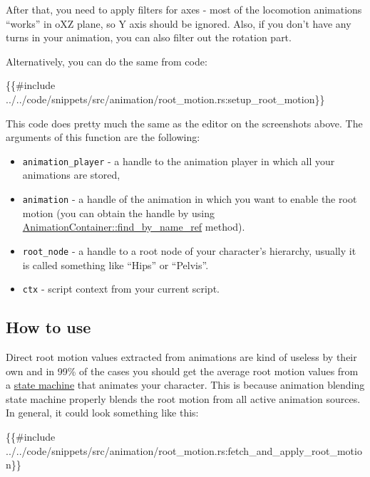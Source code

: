 \documentclass[
]{book}
\newenvironment{Shaded}{\begin{snugshade}}{\end{snugshade}}
\newcommand{\NormalTok}[1]{#1}
\providecommand{\tightlist}{%
  \setlength{\itemsep}{0pt}\setlength{\parskip}{0pt}}
\theoremstyle{definition}
\theoremstyle{definition}
\theoremstyle{definition}
\theoremstyle{definition}
\theoremstyle{remark}
\begin{document}
After that, you need to apply filters for axes - most of the locomotion animations ``works'' in oXZ plane, so Y axis should be ignored. Also, if you don't have any turns in your animation, you can also filter out the rotation part.

Alternatively, you can do the same from code:

\begin{Shaded}
\begin{Highlighting}[]
\NormalTok{\{\{\#include ../../code/snippets/src/animation/root\_motion.rs:setup\_root\_motion\}\}}
\end{Highlighting}
\end{Shaded}

This code does pretty much the same as the editor on the screenshots above. The arguments of this function are the following:

\begin{itemize}
\tightlist
\item
  \texttt{animation\_player} - a handle to the animation player in which all your animations are stored,
\item
  \texttt{animation} - a handle of the animation in which you want to enable the root motion (you can obtain the handle by using \href{https://docs.rs/fyrox/latest/fyrox/animation/struct.AnimationContainer.html\#method.find_by_name_ref}{AnimationContainer::find\_by\_name\_ref} method).
\item
  \texttt{root\_node} - a handle to a root node of your character's hierarchy, usually it is called something like ``Hips'' or ``Pelvis''.
\item
  \texttt{ctx} - script context from your current script.
\end{itemize}

\subsection{How to use}\label{how-to-use-1}

Direct root motion values extracted from animations are kind of useless by their own and in 99\% of the cases you should get the average root motion values from a \href{../blending.md}{state machine} that animates your character. This is because animation blending state machine properly blends the root motion from all active animation sources. In general, it could look something like this:

\begin{Shaded}
\begin{Highlighting}[]
\NormalTok{\{\{\#include ../../code/snippets/src/animation/root\_motion.rs:fetch\_and\_apply\_root\_motion\}\}}
\end{Highlighting}
\end{Shaded}
\end{document}
